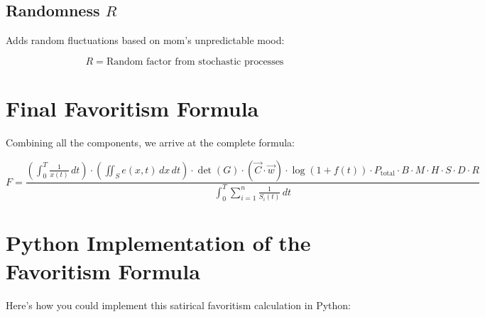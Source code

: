 \documentclass[12pt]{article}
\begin{document}
\subsection{Randomness \( R \)}
Adds random fluctuations based on mom's unpredictable mood:

\begin{equation}
R = \text{Random factor from stochastic processes}
\end{equation}

\section{Final Favoritism Formula}

Combining all the components, we arrive at the complete formula:

\begin{equation}
F = \frac{\left( \displaystyle \int_0^T \frac{1}{x(t)} \, dt \right) \cdot \left( \displaystyle \iint_S e(x, t) \, dx \, dt \right) \cdot \det(G) \cdot \left( \vec{C} \cdot \vec{w} \right) \cdot \log(1 + f(t)) \cdot P_{\text{total}} \cdot B \cdot M \cdot H \cdot S \cdot D \cdot R}{\displaystyle \int_0^T \sum_{i=1}^{n} \frac{1}{S_i(t)} \, dt}
\end{equation}

\section{Python Implementation of the Favoritism Formula}

Here’s how you could implement this satirical favoritism calculation in Python:
\end{document}
